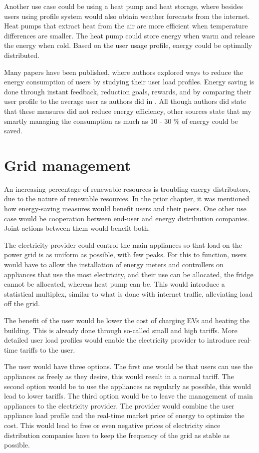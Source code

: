 \documentclass[
11pt, %
english, %
singlespacing, %
headsepline, %
]{MastersDoctoralThesis} %
\begin{document}
Another use case could be using a heat pump and heat storage,
where besides users using profile system would also obtain weather forecasts from the internet.
Heat pumps that extract heat from the air are more efficient when temperature differences are smaller. 
The heat pump could store energy when warm and release the energy when cold.
Based on the user usage profile, energy could be optimally distributed.

Many papers have been published, where authors explored ways to reduce the energy consumption of users by studying their user load profiles.
Energy saving is done through instant feedback, reduction goals, rewards, and by comparing their user profile to the average user as authors did in \cite{Csoknyai2019}.
All though authors did state that these measures did not reduce energy efficiency, other sources state that my smartly managing the consumption 
as much as 10 - 30 \% of energy could be saved. 

\section{Grid management}

An increasing percentage of renewable resources is troubling energy distributors, due to the nature of renewable resources.
In the prior chapter, it was mentioned how energy-saving measures would benefit users and their peers.
One other use case would be cooperation between end-user and energy distribution companies.
Joint actions between them would benefit both.

The electricity provider could control the main appliances so that load on the power grid is as uniform as possible,
with few peaks. For this to function, users would have to allow the installation of energy meters and controllers 
on appliances that use the most electricity, and their use can be allocated, the fridge cannot be allocated, whereas heat pump can be.
This would introduce a statistical multiplex, similar to what is done with internet traffic, alleviating load off the grid. 

The benefit of the user would be lower the cost of charging EVs and heating the building.
This is already done through so-called small and high tariffs.
More detailed user load profiles would enable the electricity provider to introduce real-time tariffs to the user.

The user would have three options. The first one would be that users can use the appliances as freely as they desire, this would result in a normal tariff.
The second option would be to use the appliances as regularly as possible, this would lead to lower tariffs.
The third option would be to leave the management of main appliances to the electricity provider.
The provider would combine the user appliance load profile and the real-time market price of energy to optimize the cost. 
This would lead to free or even negative prices of electricity since distribution companies have to keep the frequency of the grid as stable as possible.
\end{document}
